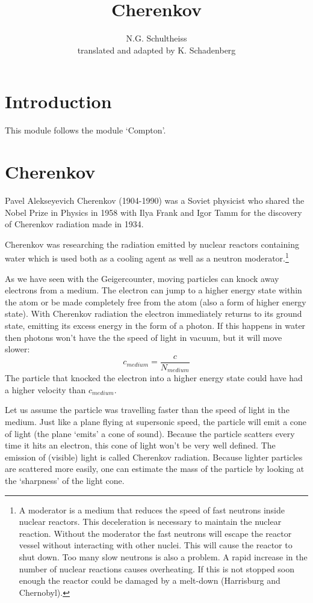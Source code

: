 \documentclass[12pt,a4paper]{article}
\author{N.G. Schultheiss \\ translated and adapted by K. Schadenberg}
\date{}
\title{Cherenkov}
\numberwithin{equation}{section}
\numberwithin{figure}{section}
\numberwithin{table}{section}
\begin{document}
\maketitle

\section{Introduction}
This module follows the module `Compton'.

\section{Cherenkov}
Pavel Alekseyevich Cherenkov (1904-1990) was a Soviet physicist who shared the Nobel Prize in Physics in 1958 with Ilya Frank and Igor Tamm for the discovery of Cherenkov radiation made in 1934.

Cherenkov was researching the radiation emitted by nuclear reactors containing water which is used both as a cooling agent as well as a neutron moderator.\footnote{A moderator is a medium that reduces the speed of fast neutrons inside nuclear reactors. This deceleration is necessary to maintain the nuclear reaction. Without the moderator the fast neutrons will escape the reactor vessel without interacting with other nuclei. This will cause the reactor to shut down. Too many slow neutrons is also a problem. A rapid increase in the number of nuclear reactions causes overheating. If this is not stopped soon enough the reactor could be damaged by a melt-down (Harrisburg and Chernobyl).}

As we have seen with the Geigercounter, moving particles can knock away electrons from a medium. The electron can jump to a higher energy state within the atom or be made completely free from the atom (also a form of higher energy state). With Cherenkov radiation the electron immediately returns to its ground state, emitting its excess energy in the form of a photon. If this happens in water then photons won't have the the speed of light in vacuum, but it will move slower:
\begin{equation*}
c_{medium} = \frac{c}{N_{medium}}
\end{equation*}
The particle that knocked the electron into a higher energy state could have had a higher velocity than $c_{medium}$.

Let us assume the particle was travelling faster than the speed of light in the medium. Just like a plane flying at supersonic speed, the particle will emit a cone of light (the plane `emits' a cone of sound). Because the particle scatters every time it hits an electron, this cone of light won't be very well defined. The emission of (visible) light is called Cherenkov radiation. Because lighter particles are scattered more easily, one can estimate the mass of the particle by looking at the `sharpness' of the light cone.
\end{document}
